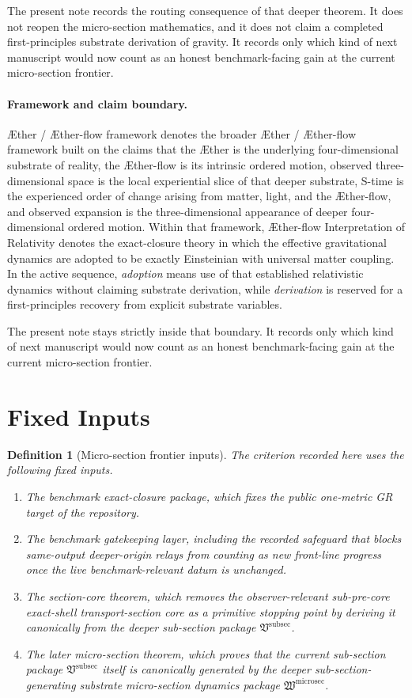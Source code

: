 \documentclass[11pt]{article}
\newcommand{\Aether}{\AE{}ther}
\newcommand{\Aflow}{\AE{}ther-flow}
\newcommand{\TheoryName}{\Aflow{} Interpretation of Relativity}
\newcommand{\TheoryProgram}{\Aether{} / \Aflow{} framework}
\newcommand{\SubSectionPackage}{\mathfrak V^{\mathrm{subsec}}}
\newcommand{\MicroSectionPackage}{\mathfrak W^{\mathrm{microsec}}}
\newtheorem{definition}{Definition}
\begin{document}
The present note records the routing consequence of that deeper theorem. It does not reopen the micro-section mathematics, and it does not claim a completed first-principles substrate derivation of gravity. It records only which kind of next manuscript would now count as an honest benchmark-facing gain at the current micro-section frontier.

\paragraph{Framework and claim boundary.}
\TheoryProgram{} denotes the broader \Aether{} / \Aflow{} framework built on the claims that the \Aether{} is the underlying four-dimensional substrate of reality, the \Aflow{} is its intrinsic ordered motion, observed three-dimensional space is the local experiential slice of that deeper substrate, S-time is the experienced order of change arising from matter, light, and the \Aflow{}, and observed expansion is the three-dimensional appearance of deeper four-dimensional ordered motion. Within that framework, \TheoryName{} denotes the exact-closure theory in which the effective gravitational dynamics are adopted to be exactly Einsteinian with universal matter coupling. In the active sequence, \emph{adoption} means use of that established relativistic dynamics without claiming substrate derivation, while \emph{derivation} is reserved for a first-principles recovery from explicit substrate variables.

The present note stays strictly inside that boundary. It records only which kind of next manuscript would now count as an honest benchmark-facing gain at the current micro-section frontier.

\section{Fixed Inputs}

\begin{definition}[Micro-section frontier inputs]
The criterion recorded here uses the following fixed inputs.
\begin{enumerate}
    \item The benchmark exact-closure package, which fixes the public one-metric GR target of the repository.
    \item The benchmark gatekeeping layer, including the recorded safeguard that blocks same-output deeper-origin relays from counting as new front-line progress once the live benchmark-relevant datum is unchanged.
    \item The section-core theorem, which removes the observer-relevant sub-pre-core exact-shell transport-section core as a primitive stopping point by deriving it canonically from the deeper sub-section package \(\SubSectionPackage\).
    \item The later micro-section theorem, which proves that the current sub-section package \(\SubSectionPackage\) itself is canonically generated by the deeper sub-section-generating substrate micro-section dynamics package \(\MicroSectionPackage\).
\end{enumerate}
\end{definition}
\end{document}
